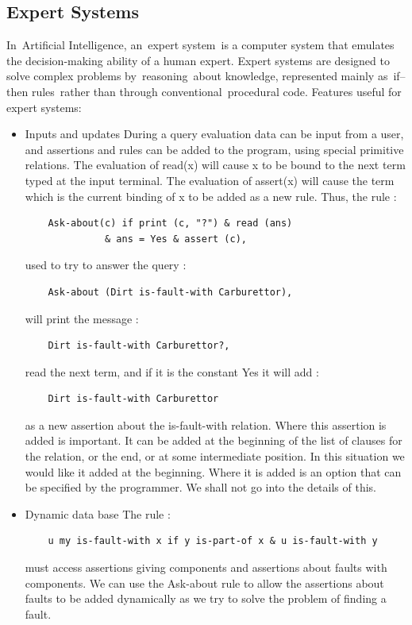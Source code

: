 \documentclass[14pt]{article}
\begin{document}
\subsection{Expert Systems}
In Artificial Intelligence, an expert system is a computer system that emulates the decision-making ability of a human expert. Expert systems are designed to solve complex problems by reasoning about knowledge, represented mainly as if–then rules rather than through conventional procedural code. 
Features useful for expert systems:
\begin{itemize}
\item Inputs and updates   
During a query evaluation data can be input from a user, and assertions 
and rules can be added to the program, using special primitive 
relations. The evaluation of read(x) will cause x to be bound to the next term typed at the input terminal. The evaluation of assert(x) will cause the term which is the current binding of x to be added as a new rule. Thus, the rule :
\begin{verbatim}
	Ask-about(c) if print (c, "?") & read (ans)
		      & ans = Yes & assert (c),
\end{verbatim}
used to try to answer the query :
\begin{verbatim}
	Ask-about (Dirt is-fault-with Carburettor),
\end{verbatim}
will print the message :
\begin{verbatim}
	Dirt is-fault-with Carburettor?, 
\end{verbatim}
read the next term, and if it is the constant Yes it will add :
\begin{verbatim}
	Dirt is-fault-with Carburettor
\end{verbatim}
as a new assertion about the is-fault-with relation. Where this assertion is added is important. It can be added at the beginning of the list of clauses for the relation, or the end, or at some intermediate position. In this situation we would like it added at the beginning. Where it is added is an option that can be specified by the programmer. We shall not go into the details of this. 
\item Dynamic data base 
The rule :
\begin{verbatim}
	u my is-fault-with x if y is-part-of x & u is-fault-with y 
\end{verbatim}
must access assertions giving components and assertions about faults with components. We can use the Ask-about rule to allow the assertions about faults to be added dynamically as we try to solve the problem of finding a fault. 


\end{itemize}
\end{document}

